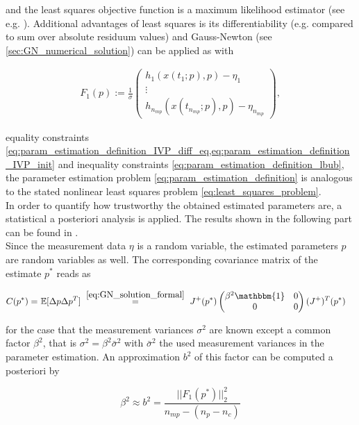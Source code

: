 \documentclass{scrartcl}[12pt, halfparskip]
\numberwithin{equation}{section}
\numberwithin{figure}{section}
\numberwithin{table}{section}
\begin{document}
and the least squares objective function is a maximum likelihood estimator (see e.g. \cite{disseration_andreas_sommer}). Additional advantages of least squares is its differentiability (e.g. compared to sum over absolute residuum values) and Gauss-Newton (see \cref{sec:GN_numerical_solution}) can be applied as with

\begin{align}
F_1(p) := \frac{1}{\sigma}
\begin{pmatrix}
h_1(x(t_1;p),p) - \eta_1 \\
\vdots \\
h_{n_{mp}}(x(t_{n_{mp}};p),p) - \eta_{n_{mp}}
\end{pmatrix},
\end{align}

equality constraints \cref{eq:param_estimation_definition_IVP_diff_eq,eq:param_estimation_definition_IVP_init} and inequality constraints \cref{eq:param_estimation_definition_lbub}, the parameter estimation problem \cref{eq:param_estimation_definition} is analogous to the stated nonlinear least squares problem \cref{eq:least_squares_problem}. \\

In order to quantify how trustworthy the obtained estimated parameters are, a statistical a posteriori analysis is applied. The results shown in the following part can be found in \cite{diss_bock}. \\
Since the measurement data $\eta$ is a random variable, the estimated parameters $p$ are random variables as well. The corresponding covariance matrix of the estimate $p^*$ reads as

\begin{align}
	C(p^*) = & \ \mathbb{E} [ \Delta p \Delta p^T ]
	\ \stackrel{\cref{eq:GN_solution_formal}}{=} \ J^+(p^*)
	\begin{pmatrix}
	\beta^2  \mathbbm{1} & 0 \\
	0 & 0
	\end{pmatrix}
	(J^+)^T(p^*) 
	\label{eq:stat_ana_covariance_matrix}
\end{align}

for the case that the measurement variances $\sigma^2$ are known except a common factor $\beta^2$, that is $\sigma^2 = \beta^2 \bar{\sigma}^2$ with $\bar{\sigma}^2$ the used measurement variances in the parameter estimation. An approximation $b^2$ of this factor can be computed a posteriori by

\begin{equation}
	\beta^2 \approx b^2 = \frac{|| F_1(p^*) ||_2^2}{n_{mp} - (n_p - n_c)}
\end{equation}
\end{document}
